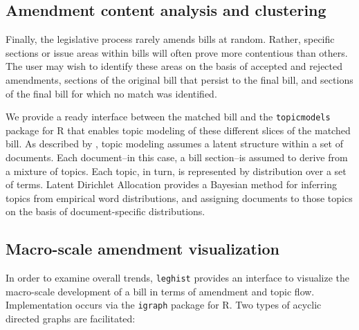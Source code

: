 \documentclass[11pt]{article}
\begin{document}
\subsection{Amendment content analysis and clustering}
\label{sec:amendm-cont-analys}

Finally, the legislative process rarely amends bills at
random. Rather, specific sections or issue areas within bills will
often prove more contentious than others. The user may wish to
identify these areas on the basis of accepted and rejected amendments,
sections of the original bill that persist to the final bill, and
sections of the final bill for which no match was identified. 

We provide a ready interface between the matched bill and the
\texttt{topicmodels} package for R that enables topic modeling of
these different slices of the matched bill. As described by
\cite{blei2003latent}, topic modeling assumes a latent
structure within a set of documents. Each document--in this case, a
bill section--is assumed to derive from a mixture of topics. Each
topic, in turn, is represented by distribution over a
set of terms. Latent Dirichlet Allocation provides a Bayesian method
for inferring topics from empirical word distributions, and assigning
documents to those topics on the basis of document-specific
distributions. 

\subsection{Macro-scale amendment visualization}
\label{sec:macro-scale-vis}

In order to examine overall trends, \texttt{leghist} provides an interface to visualize the macro-scale development of a bill in terms of amendment and topic flow. Implementation occurs via the \texttt{igraph} package for R. Two types of acyclic directed graphs are facilitated:
\end{document}
